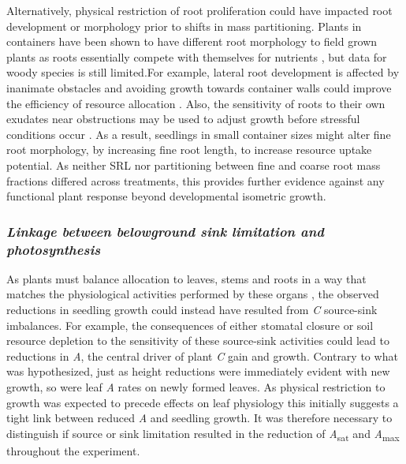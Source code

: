 \documentclass[a4paper]{article}\usepackage[]{graphicx}\usepackage[]{color}
\begin{document}
Alternatively, physical restriction of root proliferation could have impacted root development or morphology prior to shifts in mass partitioning. Plants in containers have been shown to have different root morphology to field grown plants as roots essentially compete with themselves for nutrients \citep{nesmith1998effect}, but data for woody species is still limited.For example, lateral root development is affected by inanimate obstacles and avoiding growth towards container walls could improve the efficiency of resource allocation \citep{falik2005root}. Also, the sensitivity of roots to their own exudates near obstructions may be used to adjust growth before stressful conditions occur \citep{semchenko2008foraging}. As a result, seedlings in small container sizes might alter fine root morphology, by increasing fine root length, to increase resource uptake potential. 
As neither SRL nor partitioning between fine and coarse root mass fractions differed across treatments, this provides further evidence against any functional plant response beyond developmental isometric growth.

\subsubsection*{\textit{Linkage between belowground sink limitation and photosynthesis}}

As plants must balance allocation to leaves, stems and roots in a way that matches the physiological activities performed by these organs \citep{poorter2012biomass}, the observed reductions in seedling growth could instead have resulted from \textit{C} source-sink imbalances. For example, the consequences of either stomatal closure or soil resource depletion to the sensitivity of these source-sink activities could lead to reductions in \textit{A}, the central driver of plant \textit{C} gain and growth. Contrary to what was hypothesized, just as height reductions were immediately evident with new growth, so were leaf \textit{A} rates on newly formed leaves. As physical restriction to growth was expected to precede effects on leaf physiology this initially suggests a tight link between reduced \textit{A} and seedling growth. It was therefore necessary to distinguish if source or sink limitation resulted in the reduction of \textit{A}\textsubscript{sat} and \textit{A}\textsubscript{max}  throughout the experiment.
\end{document}
